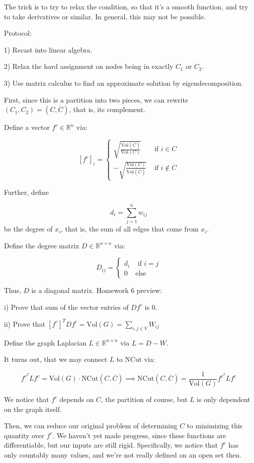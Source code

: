 \documentclass[10pt]{article}
\begin{document}
The trick is to try to relax the condition, so that it’s a smooth function, and try to take derivatives or similar. In general, this may not be possible.

Protocol:

1) Recast into linear algebra.

2) Relax the hard assignment on nodes being in exactly $C_1$ or $C_2$.

3) Use matrix calculus to find an approximate solution by eigendecomposition.

First, since this is a partition into two pieces, we can rewrite $(C_1,C_2) = (C, \overline{C})$, that is, its complement.

Define a vector $f^c \in \mathbb{R}^n$ via:

$$ [f^c]_i = \begin{cases} \sqrt{\frac{\text{Vol}(\overline{C})}{\text{Vol}(C)}} & \text{ if } i \in C \\ -\sqrt{\frac{\text{Vol}(C)}{\text{Vol}(\overline{C})}} & \text{ if } i \not \in C \end{cases} $$

Further, define

$$d_i = \sum_{j=1}^n w_{ij}$$ be the degree of $x_i$, that is, the sum of all edges that come from $x_i$. 

Define the degree matrix $D \in \mathbb{R}^{n \times n}$ via:

$$D_{ij} = \begin{cases} d_i & \text{ if } i = j \\ 0 & \text{else} \end{cases} $$

Thus, $D$ is a diagonal matrix. Homework 6 preview:

i) Prove that sum of the vector entries of $D f^c$ is 0. 

ii) Prove that $[f^c]^T D f^c = \text{Vol}(G) = \sum_{i,j \in V} W_{ij} $

Define the graph Laplacian $L \in \mathbb{R}^{n \times n}$ via $L = D - W$. 

It turns out, that we may connect $L$ to NCut via:

$$f^{c^T} L f^c = \text{Vol}(G) \cdot \text{NCut}(C, \overline{C}) \implies \text{NCut}(C, \overline{C}) = \frac{1}{\text{Vol}(G)}f^{c^T} L f^c $$

We notice that $f^c$ depends on $C$, the partition of course, but $L$ is only dependent on the graph itself.

Then, we can reduce our original problem of determining $C$ to minimizing this quantity over $f^c$. We haven’t yet made progress, since these functions are differentiable, but our inputs are still rigid. Specifically, we notice that $f^c$ has only countably many values, and we’re not really defined on an open set then.
\end{document}
